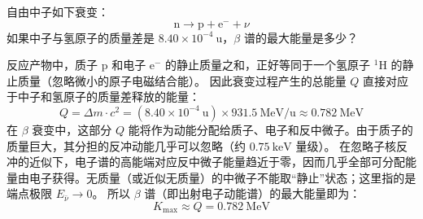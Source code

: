 \begin{exercise}\label{ex:29.21}
自由中子如下衰变：
$$ \mathrm{n} \rightarrow \mathrm{p} + \mathrm{e}^- + \nu $$
如果中子与氢原子的质量差是 $8.40 \times 10^{-4} \ \mathrm{u}$，$\beta$ 谱的最大能量是多少？
\end{exercise}
\begin{solution}
反应产物中，质子 $\mathrm{p}$ 和电子 $\mathrm{e}^-$ 的静止质量之和，正好等同于一个氢原子 $^{1}\mathrm{H}$ 的静止质量（忽略微小的原子电磁结合能）。
因此衰变过程产生的总能量 $Q$ 直接对应于中子和氢原子的质量差释放的能量：
$$ Q = \Delta m \cdot c^2 = (8.40 \times 10^{-4} \ \mathrm{u}) \times 931.5 \ \mathrm{MeV/u} \approx 0.782 \ \mathrm{MeV} $$
在 $\beta$ 衰变中，这部分 $Q$ 能将作为动能分配给质子、电子和反中微子。由于质子的质量巨大，其分担的反冲动能几乎可以忽略（约 $0.75 \ \mathrm{keV}$ 量级）。
在忽略子核反冲的近似下，电子谱的高能端对应反中微子能量趋近于零，因而几乎全部可分配能量由电子获得。无质量（或近似无质量）的中微子不能取“静止”状态；这里指的是端点极限 $E_{\bar\nu}\to0$。
所以 $\beta$ 谱（即出射电子动能谱）的最大能量即为：
$$ K_{\max} \approx Q = 0.782 \ \mathrm{MeV} $$
\end{solution}

